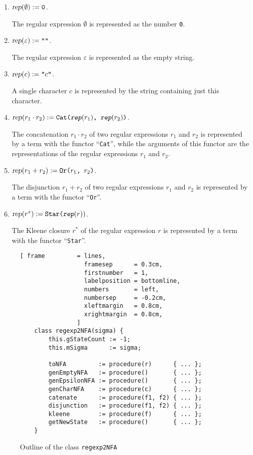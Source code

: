 \begin{enumerate}
\item $\textsl{rep}(\emptyset) := \texttt{0}$.

      The regular expression $\emptyset$ is represented as the number \texttt{0}.
\item $\textsl{rep}(\varepsilon) := \texttt{\symbol{34}\symbol{34}}$.
  
      The regular expression $\varepsilon$ is represented as the empty string.
\item $\textsl{rep}(c) := \texttt{\symbol{34}$c$\symbol{34}}$.

      A single character $c$ is represented by the string containing just this character.
\item $\textsl{rep}(r_1 \cdot r_2) := \texttt{Cat($\textsl{rep}(r_1)$, $\textsl{rep}(r_2)$)}$.
  
      The concatenation $r_1 \cdot r_2$ of two regular expressions $r_1$ and $r_2$ is
      represented by a term with the functor ``\texttt{Cat}'', while the arguments of this
      functor are the representations of the regular expressions $r_1$ and $r_2$.
\item $\textsl{rep}(r_1 + r_2) := \texttt{Or($r_1$, $r_2$)}$.

      The disjunction $r_1 + r_2$ of two regular expressions $r_1$ and $r_2$ is
      represented by a term with the functor ``\texttt{Or}''.

\item $\textsl{rep}(r^*) := \texttt{Star($\textsl{rep}(r))$}$.

      The Kleene closure $r^*$ of the  regular expression $r$ is
      represented by a term with the functor ``\texttt{Star}''.
\end{enumerate}


\begin{figure}[!ht]
\centering
\begin{Verbatim}[ frame         = lines, 
                  framesep      = 0.3cm, 
                  firstnumber   = 1,
                  labelposition = bottomline,
                  numbers       = left,
                  numbersep     = -0.2cm,
                  xleftmargin   = 0.8cm,
                  xrightmargin  = 0.8cm,
                ]
    class regexp2NFA(sigma) {
        this.gStateCount := -1;
        this.mSigma      := sigma;
        
        toNFA         := procedure(r)      { ... };    
        genEmptyNFA   := procedure()       { ... };
        genEpsilonNFA := procedure()       { ... };
        genCharNFA    := procedure(c)      { ... };
        catenate      := procedure(f1, f2) { ... };
        disjunction   := procedure(f1, f2) { ... };
        kleene        := procedure(f)      { ... };
        getNewState   := procedure()       { ... };
    }
\end{Verbatim}
\vspace*{-0.3cm}
\caption{Outline of the class \texttt{regexp2NFA}}
\label{fig:regexp-2-nfa.stlx}
\end{figure}

